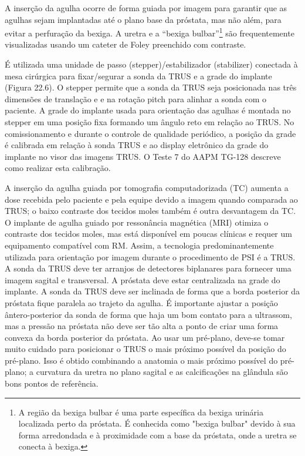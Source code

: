 \documentclass[11pt,a4paper]{article}
\begin{document}
	A inserção da agulha ocorre de forma guiada por imagem para garantir que as agulhas sejam implantadas até o plano base da próstata, mas não além, para evitar a perfuração da bexiga. A uretra e a ``bexiga bulbar''\footnote{A região da bexiga bulbar é uma parte específica da bexiga urinária localizada perto da próstata. É conhecida como "bexiga bulbar" devido à sua forma arredondada e à proximidade com a base da próstata, onde a uretra se conecta à bexiga.} são frequentemente visualizadas usando um cateter de Foley preenchido com contraste.

	É utilizada uma unidade de passo (stepper)/estabilizador (stabilizer) conectada à mesa cirúrgica para fixar/segurar a sonda da TRUS e a grade do implante (Figura 22.6). O stepper permite que a sonda da TRUS seja posicionada nas três dimensões de translação e e na rotação pitch para alinhar a sonda com o paciente. A grade do implante usada para orientação das agulhas é montada no stepper em uma posição fixa formando um ângulo reto em relação ao TRUS. No comissionamento e durante o controle de qualidade periódico, a posição da grade é calibrada em relação à sonda TRUS e ao display eletrônico da grade do implante no visor das imagens TRUS. O Teste 7 do AAPM TG-128 descreve como realizar esta calibração.

	A inserção da agulha guiada por tomografia computadorizada (TC) aumenta a dose recebida pelo paciente e pela equipe devido a imagem quando comparada ao TRUS; o baixo contraste dos tecidos moles também é outra desvantagem da TC. O implante de agulha guiado por ressonância magnética (MRI) otimiza o contraste dos tecidos moles, mas está disponível em poucas clínicas e requer um  equipamento compatível com RM. Assim, a tecnologia predominantemente utilizada para orientação por imagem durante o procedimento de PSI é a TRUS. A sonda da TRUS deve ter arranjos de detectores biplanares para fornecer uma imagem sagital e transversal. A próstata deve estar centralizada na grade do implante. A sonda da TRUS deve ser inclinada de forma que a borda posterior da próstata fique paralela ao trajeto da agulha. É importante ajustar a posição ântero-posterior da sonda de forma que haja um bom contato para a ultrassom, mas a pressão na próstata não deve ser tão alta a ponto de criar uma forma convexa da borda posterior da próstata. Ao usar um pré-plano, deve-se tomar muito cuidado para posicionar o TRUS o mais próximo possível da posição do pré-plano. Isso é obtido combinando a anatomia o mais próximo possível do pré-plano; a curvatura da uretra no plano sagital e as calcificações na glândula são bons pontos de referência.
\end{document}
